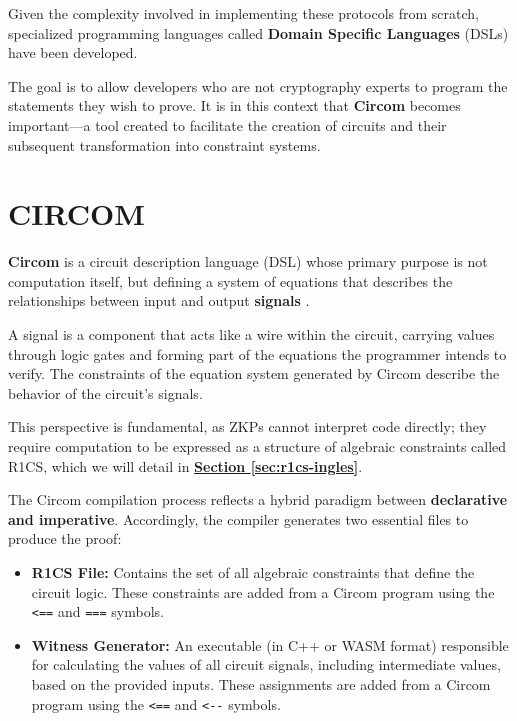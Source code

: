 \documentclass[a4paper,12pt]{report}
\begin{document}
	
	\vspace{0.25cm}
	
	\noindent Given the complexity involved in implementing these protocols from scratch, specialized programming languages called \textbf{Domain Specific Languages} (DSLs) have been developed. 
	
	\vspace{0.25cm}
	
	\noindent The goal is to allow developers who are not cryptography experts to program the statements they wish to prove. It is in this context that \textbf{Circom} becomes important—a tool created to facilitate the creation of circuits and their subsequent transformation into constraint systems.
	
	\vspace{0.25cm}
	
	\section{CIRCOM}
	\label{s:circom-ingles}
	\noindent \textbf{Circom} is a circuit description language (DSL) whose primary purpose is not computation itself, but defining a system of equations that describes the relationships between input and output \textbf{signals} \cite{thesis_clara}.\vspace{0.3cm}
	
	\noindent A signal is a component that acts like a wire within the circuit, carrying values through logic gates and forming part of the equations the programmer intends to verify. The constraints of the equation system generated by Circom describe the behavior of the circuit's signals.
	
	\vspace{0.3cm}
	
	\noindent This perspective is fundamental, as ZKPs cannot interpret code directly; they require computation to be expressed as a structure of algebraic constraints called R1CS, which we will detail in \hyperref[sec:r1cs-ingles]{\textbf{Section \ref{sec:r1cs-ingles}}}.
	
	
	\vspace{0.3cm}
	
	\noindent The Circom compilation process reflects a hybrid paradigm between \textbf{declarative and imperative}. Accordingly, the compiler generates two essential files to produce the proof:
	
	\begin{itemize}
		\item \textbf{R1CS File:} Contains the set of all algebraic constraints that define the circuit logic. These constraints are added from a Circom program using the \texttt{<==} and \texttt{===} symbols.
		\item \textbf{Witness Generator:} An executable (in C++ or WASM format) responsible for calculating the values of all circuit signals, including intermediate values, based on the provided inputs. These assignments are added from a Circom program using the \texttt{<==} and \texttt{<-}\texttt{-} symbols.
	\end{itemize}
	
\end{document}
